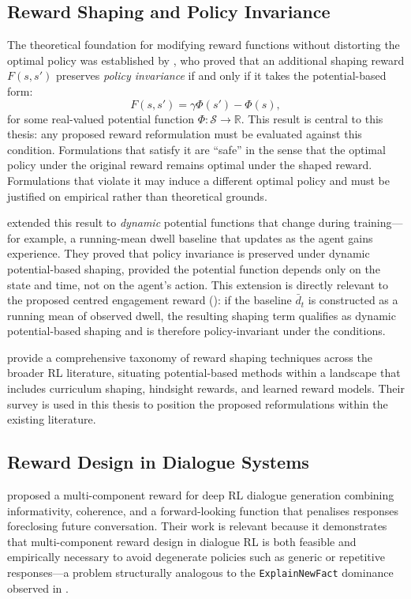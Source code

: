\documentclass[12pt,a4paper]{article}
\begin{document}
\subsection{Reward Shaping and Policy Invariance}

The theoretical foundation for modifying reward functions without distorting the optimal policy was established by \citet{ng1999}, who proved that an additional shaping reward $F(s, s')$ preserves \emph{policy invariance} if and only if it takes the potential-based form:
\begin{equation}
\label{eq:pbrs}
F(s, s') = \gamma \Phi(s') - \Phi(s),
\end{equation}
for some real-valued potential function $\Phi: \mathcal{S} \to \mathbb{R}$. This result is central to this thesis: any proposed reward reformulation must be evaluated against this condition. Formulations that satisfy it are ``safe'' in the sense that the optimal policy under the original reward remains optimal under the shaped reward. Formulations that violate it may induce a different optimal policy and must be justified on empirical rather than theoretical grounds.

\citet{devlin2012} extended this result to \emph{dynamic} potential functions that change during training---for example, a running-mean dwell baseline that updates as the agent gains experience. They proved that policy invariance is preserved under dynamic potential-based shaping, provided the potential function depends only on the state and time, not on the agent's action. This extension is directly relevant to the proposed centred engagement reward (): if the baseline $\bar{d}_t$ is constructed as a running mean of observed dwell, the resulting shaping term qualifies as dynamic potential-based shaping and is therefore policy-invariant under the \citet{devlin2012} conditions.

\citet{ibrahim2024} provide a comprehensive taxonomy of reward shaping techniques across the broader RL literature, situating potential-based methods within a landscape that includes curriculum shaping, hindsight rewards, and learned reward models. Their survey is used in this thesis to position the proposed reformulations within the existing literature.

\subsection{Reward Design in Dialogue Systems}

\citet{li2016} proposed a multi-component reward for deep RL dialogue generation combining informativity, coherence, and a forward-looking function that penalises responses foreclosing future conversation. Their work is relevant because it demonstrates that multi-component reward design in dialogue RL is both feasible and empirically necessary to avoid degenerate policies such as generic or repetitive responses---a problem structurally analogous to the \texttt{ExplainNewFact} dominance observed in \citet{bourdon2025}.
\end{document}
